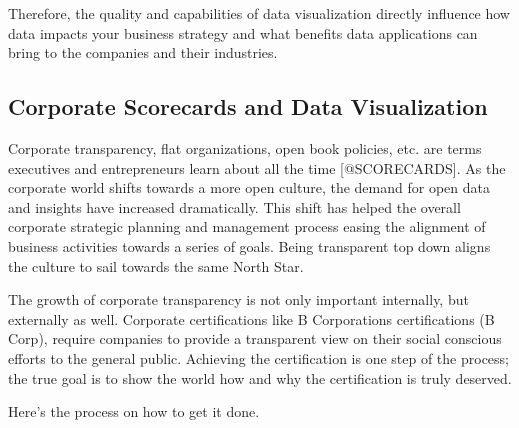 \documentclass[]{book}
\theoremstyle{definition}
\theoremstyle{definition}
\theoremstyle{definition}
\theoremstyle{remark}
\begin{document}
Therefore, the quality and capabilities of data visualization directly
influence how data impacts your business strategy and what benefits data
applications can bring to the companies and their industries.

\subsection{Corporate Scorecards and Data
Visualization}\label{corporate-scorecards-and-data-visualization}

Corporate transparency, flat organizations, open book policies, etc. are
terms executives and entrepreneurs learn about all the time
{[}@SCORECARDS{]}. As the corporate world shifts towards a more open
culture, the demand for open data and insights have increased
dramatically. This shift has helped the overall corporate strategic
planning and management process easing the alignment of business
activities towards a series of goals. Being transparent top down aligns
the culture to sail towards the same North Star.

The growth of corporate transparency is not only important internally,
but externally as well. Corporate certifications like B Corporations
certifications (B Corp), require companies to provide a transparent view
on their social conscious efforts to the general public. Achieving the
certification is one step of the process; the true goal is to show the
world how and why the certification is truly deserved.

Here's the process on how to get it done.
\end{document}
